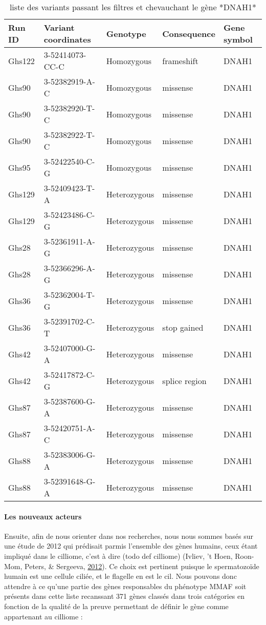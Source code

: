 \documentclass[12pt,twoside]{reedthesis}
\theoremstyle{definition}
\theoremstyle{definition}
\theoremstyle{remark}
\begin{document}
  \begin{longtable}[t]{lllll}
  \caption{\label{tab:tabdnah1}liste des variants passant les filtres et chevauchant le gène *DNAH1*}\\
  \toprule
  Run ID & Variant coordinates & Genotype & Consequence & Gene symbol\\
  \midrule
  Ghs122 & 3-52414073-CC-C & Homozygous & frameshift & DNAH1\\
  Ghs90 & 3-52382919-A-C & Homozygous & missense & DNAH1\\
  Ghs90 & 3-52382920-T-C & Homozygous & missense & DNAH1\\
  Ghs90 & 3-52382922-T-C & Homozygous & missense & DNAH1\\
  Ghs95 & 3-52422540-C-G & Homozygous & missense & DNAH1\\
  \addlinespace
  Ghs129 & 3-52409423-T-A & Heterozygous & missense & DNAH1\\
  Ghs129 & 3-52423486-C-G & Heterozygous & missense & DNAH1\\
  Ghs28 & 3-52361911-A-G & Heterozygous & missense & DNAH1\\
  Ghs28 & 3-52366296-A-G & Heterozygous & missense & DNAH1\\
  Ghs36 & 3-52362004-T-G & Heterozygous & missense & DNAH1\\
  \addlinespace
  Ghs36 & 3-52391702-C-T & Heterozygous & stop gained & DNAH1\\
  Ghs42 & 3-52407000-G-A & Heterozygous & missense & DNAH1\\
  Ghs42 & 3-52417872-C-G & Heterozygous & splice region & DNAH1\\
  Ghs87 & 3-52387600-G-A & Heterozygous & missense & DNAH1\\
  Ghs87 & 3-52420751-A-C & Heterozygous & missense & DNAH1\\
  \addlinespace
  Ghs88 & 3-52383006-G-A & Heterozygous & missense & DNAH1\\
  Ghs88 & 3-52391648-G-A & Heterozygous & missense & DNAH1\\
  \bottomrule
  \end{longtable}
  
  \newpage
  
  \paragraph{Les nouveaux acteurs}\label{les-nouveaux-acteurs}
  
  Ensuite, afin de nous orienter dans nos recherches, nous nous sommes
  basés sur une étude de 2012 qui prédisait parmis l'ensemble des gènes
  humains, ceux étant impliqué dans le cilliome, c'est à dire (todo def
  cilliome) (Ivliev, 't Hoen, Roon-Mom, Peters, \& Sergeeva,
  \protect\hyperlink{ref-Ivliev2012}{2012}). Ce choix est pertinent
  puisque le spermatozoïde humain est une cellule ciliée, et le flagelle
  en est le cil. Nous pouvons donc attendre à ce qu'une partie des gènes
  responsables du phénotype MMAF soit présents dans cette liste recanssant
  371 gènes classés dans trois catégories en fonction de la qualité de la
  preuve permettant de définir le gène comme appartenant au cilliome :
  
\end{document}
